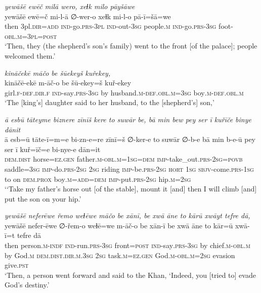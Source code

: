 \ea \label{KŠ.94}
\textit{yewāšē ewēč milā wero, xeɫk milo pāyšāwe} \\ 
\gll yewāšē ewē=č mi-l-ā ∅-wer-o xeɫk mi-l-o pā-ī=šā=we \\ 
 then 3pl\textsc{.dir}\textsc{=add} \textsc{ind-}go\textsc{.prs}\textsc{-3pl} \textsc{ind-}out\textsc{-3sg} people\textsc{.m} \textsc{ind-}go\textsc{.prs}\textsc{-3sg} foot\textsc{-obl}\textsc{.m}\textsc{=3pl}\textsc{=\textsc{post}} \\ 
\glt `Then, they (the shepherd’s son’s family) went to the front [of the palace]; people welcomed them.'
\z 
 
\ea \label{KŠ.95}
\textit{kināčekē māčo be šūekeyš kuřekey,} \\ 
\gll kināčē-ekē m-āč-o be šū-ekey=š kuř-ekey \\ 
 girl\textsc{.f}\textsc{-def}\textsc{.dir}\textsc{.f} \textsc{ind-}say\textsc{.prs}\textsc{-3sg} by husband\textsc{.m}\textsc{-def}\textsc{.obl}\textsc{.m}\textsc{=3sg} boy\textsc{.m}\textsc{-def}\textsc{.obl}\textsc{.m} \\ 
\glt `The [king’s] daughter said to her husband, to the [shepherd’s] son,'
\z 
 
\ea \label{KŠ.96}
\textit{ā esbū tāteyme biznere zīnīš kere to suwār be, bā min bew pey ser ī kuřīče binye dānit} \\ 
\gll ā esb=ū tāte-ī=m=e bi-zn-e=re zīnī=š ∅-ker-e to suwār ∅-b-e bā min b-e-ū pey ser ī kuř=īč=e bi-nye-e dān=it \\ 
 \textsc{dem.dist} horse\textsc{\textsc{=ez.gen}} father\textsc{.m}\textsc{-obl}\textsc{.m}\textsc{=\textsc{1sg}}\textsc{=dem} \textsc{imp-}take\_out\textsc{.prs}-\textsc{2sg}\textsc{=\textsc{povb}} saddle\textsc{=3sg} \textsc{imp-}do\textsc{.prs}-\textsc{2sg} \textsc{2sg} riding \textsc{imp-}be\textsc{.prs}-\textsc{2sg} \textsc{hort} \textsc{1sg} \textsc{sbjv-}come\textsc{.prs}\textsc{-\textsc{1sg}} to on \textsc{dem.prox} boy\textsc{.m}\textsc{=add}\textsc{=dem} \textsc{imp-}put\textsc{.prs}-\textsc{2sg} hip\textsc{.m}\textsc{=\textsc{2sg}} \\ 
\glt `‘Take my father’s horse out [of the stable], mount it [and] then I will climb [and] put the son on your hip.'
\z 
 
\ea \label{KŠ.97}
\textit{yewāšē neferēwe řemo weɫēwe māčo be xānī, be xwā āne to kārū xwāyt tefre dā,} \\ 
\gll yewāšē nefer-ēwe ∅-řem-o weɫē=we m-āč-o be xān-ī be xwā āne to kār=ū xwā-ī=t tefre dā \\ 
 then person\textsc{.m}\textsc{-indf} \textsc{ind-}run\textsc{.prs}\textsc{-3sg} front\textsc{=\textsc{post}} \textsc{ind-}say\textsc{.prs}\textsc{-3sg} by chief\textsc{.m}\textsc{-obl}\textsc{.m} by God\textsc{.m} \textsc{dem.dist}\textsc{.dir}\textsc{.m}\textsc{.3sg} \textsc{2sg} task\textsc{.m}\textsc{\textsc{=ez.gen}} God\textsc{.m}\textsc{-obl}\textsc{.m}\textsc{=\textsc{2sg}} evasion give\textsc{.pst} \\ 
\glt `Then, a person went forward and said to the Khan, ‘Indeed, you [tried to] evade God’s destiny.'
\z 
 
